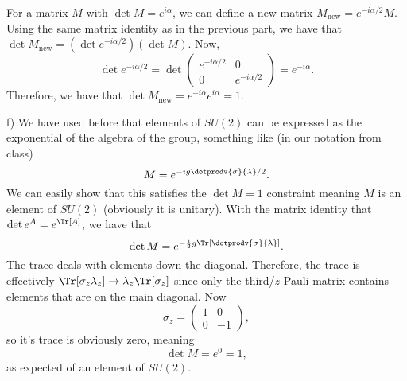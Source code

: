 \begin{parts}
\item For a matrix $M$ with $\det{M} = e^{i\alpha}$, we can define a new matrix $M_{\mathrm{new}} = e^{-i\alpha/2}M$. Using the same matrix identity as in the previous part, we have that $\det{M_{\mathrm{new}}} = (\det{e^{-i\alpha/2}})(\det{M})$. Now,
    \begin{equation}
        \det{e^{-i\alpha/2}} = \det\begin{pmatrix}e^{-i\alpha/2} & 0 \\ 0 & e^{-i\alpha/2}\end{pmatrix} = e^{-i\alpha}.
    \end{equation}
    Therefore, we have that $\det{M_{\mathrm{new}}} = e^{-i\alpha}e^{i\alpha} = 1$.


\item[f)] We have used before that elements of $SU(2)$ can be expressed as the exponential of the algebra of the group, something like (in our notation from class)
\begin{equation}
    M = e^{-ig \dotprodv{\sigma}{\lambda}/2}.
\end{equation}
We can easily show that this satisfies the $\det{M}=1$ constraint meaning $M$ is an element of $SU(2)$ (obviously it is unitary). With the matrix identity that $\det{e^{A}} = e^{\Tr[A]}$, we have that
\begin{equation}
    \det{M} = e^{-\frac{i}{2}g \Tr[\dotprodv{\sigma}{\lambda}]}.
\end{equation}
The trace deals with elements down the diagonal. Therefore, the trace is effectively $\Tr[\sigma_z \lambda_z] \rightarrow \lambda_z\Tr[\sigma_z]$ since only the third/$z$ Pauli matrix contains elements that are on the main diagonal. Now
\begin{equation}
    \sigma_z = \begin{pmatrix}1 & 0 \\ 0 & -1\end{pmatrix},
\end{equation}
so it's trace is obviously zero, meaning
\begin{equation}
    \det{M} = e^{0} = 1,
\end{equation}
as expected of an element of $SU(2)$.


\end{parts}